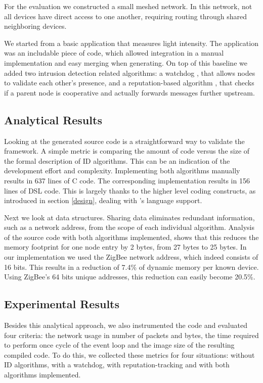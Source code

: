 \documentclass[3p,times,procedia]{elsarticle}
\begin{document}
For the evaluation we constructed a small meshed network. In this network, not
all devices have direct access to one another, requiring routing through shared
neighboring devices.

We started from a basic application that measures light intensity. The
application was an includable piece of code, which allowed integration in a
manual implementation and easy merging when generating. On top of this baseline
we added two intrusion detection related algorithms: a watchdog
\cite{mishra2004intrusion}, that allows nodes to validate each other's
presence, and a reputation-based algorithm \cite{ganeriwal2008reputation}, that
checks if a parent node is cooperative and actually forwards messages further
upstream.

\subsection{Analytical Results}

Looking at the generated source code is a straightforward way to validate the
framework. A simple metric is comparing the amount of code versus the size of
the formal description of ID algorithms. This can be an indication of the
development effort and complexity. Implementing both algorithms manually
results in 637 lines of C code. The corresponding \NAME implementation results
in 156 lines of DSL code. This is largely thanks to the higher level coding
constructs, as introduced in section \ref{design}, dealing with \NAME's
language support.

Next we look at data structures. Sharing data eliminates redundant information,
such as a network address, from the scope of each individual algorithm.
Analysis of the source code with both algorithms implemented, shows that this
reduces the memory footprint for one node entry by 2 bytes, from 27 bytes to 25
bytes. In our implementation we used the ZigBee network address, which indeed
consists of 16 bits. This results in a reduction of 7.4\% of dynamic memory per
known device. Using ZigBee's 64 bits unique addresses, this reduction can
easily become 20.5\%.

\subsection{Experimental Results}

Besides this analytical approach, we also instrumented the code and evaluated
four criteria: the network usage in number of packets and bytes, the time
required to perform once cycle of the event loop and the image size of the
resulting compiled code. To do this, we collected these metrics for four
situations: without ID algorithms, with a watchdog, with reputation-tracking
and with both algorithms implemented.
\end{document}
